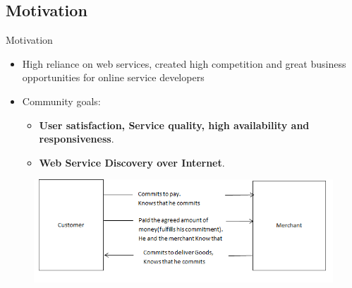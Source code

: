 \documentclass{beamer}
\begin{document}
\subsection{Motivation}
    \begin{frame}{Motivation}
    \begin{itemize}
        \item High reliance on web services, created high competition and great business opportunities for online service developers 
        \item Community goals:
        \begin{itemize}
            \item \textbf{User satisfaction, Service quality, high availability and responsiveness}.
            \item \textbf{Web Service Discovery over Internet}.
        \end{itemize}
    \end{itemize}
    \begin{figure}[htbp]
        \centering
        \includegraphics[width=1.0 \columnwidth]{figures/figure7.png}
    \end{figure}
    \end{frame}
\end{document}
